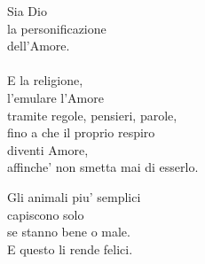 \begin{haiku}
    Sia Dio\\
    la personificazione\\
    dell'Amore.\\
    \leavevmode\\
    E la religione,\\
    l'emulare l'Amore\\
    tramite regole, pensieri, parole,\\
    fino a che il proprio respiro\\
    diventi Amore,\\
    affinche' non smetta mai di esserlo.\\
\end{haiku}




\begin{haiku}
    Gli animali piu' semplici\\
    capiscono solo\\
    se stanno bene o male.\\
    E questo li rende felici.\\
\end{haiku}

